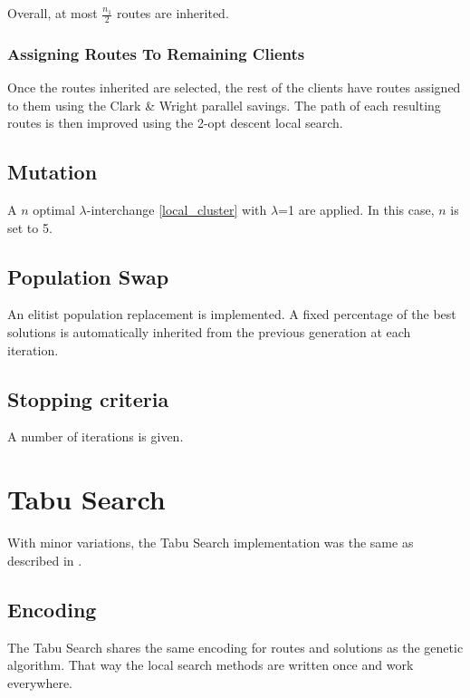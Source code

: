 \documentclass{article} %
\begin{document}
Overall, at most $\frac{n_1}{2}$ routes are inherited.

\subsubsection{Assigning Routes To Remaining Clients}

Once the routes inherited are selected, the rest of the clients have routes assigned to them using the Clark \& Wright parallel savings. The path of each resulting routes is then improved using the 2-opt descent local search.


\subsection{Mutation}

A $n$ optimal $\lambda$-interchange \ref{local_cluster} with $\lambda$=1 are applied. In this case, $n$ is set to 5.


\subsection{Population Swap}

An elitist population replacement is implemented. A fixed percentage of the best solutions is automatically inherited from the previous generation at each iteration.


\subsection{Stopping criteria}

A number of iterations is given.


\newpage
\section{Tabu Search}
\label{tabu_search}

With minor variations, the Tabu Search implementation was the same as described in \citep{osman1993}.


\subsection{Encoding}
The Tabu Search shares the same encoding for routes and solutions as the genetic algorithm. That way the local search methods are written once and work everywhere.
\end{document}
